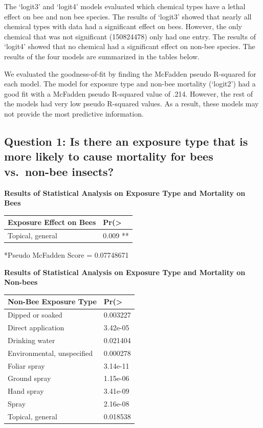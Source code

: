 \documentclass[
  12pt,
]{article}
\begin{document}
The `logit3' and `logit4' models evaluated which chemical types have a
lethal effect on bee and non bee species. The results of `logit3' showed
that nearly all chemical types with data had a significant effect on
bees. However, the only chemical that was not significant (150824478)
only had one entry. The results of `logit4' showed that no chemical had
a significant effect on non-bee species. The results of the four models
are summarized in the tables below.

We evaluated the goodness-of-fit by finding the McFadden pseudo
R-squared for each model. The model for exposure type and non-bee
mortality (`logit2') had a good fit with a McFadden pseudo R-squared
value of .214. However, the rest of the models had very low pseudo
R-squared values. As a result, these models may not provide the most
predictive information.

\hypertarget{question-1-is-there-an-exposure-type-that-is-more-likely-to-cause-mortality-for-bees-vs.-non-bee-insects}{%
\subsection{Question 1: Is there an exposure type that is more likely to
cause mortality for bees vs.~non-bee
insects?}\label{question-1-is-there-an-exposure-type-that-is-more-likely-to-cause-mortality-for-bees-vs.-non-bee-insects}}

\textbf{Results of Statistical Analysis on Exposure Type and Mortality
on Bees}

\begin{longtable}[]{@{}ll@{}}
\toprule
Exposure Effect on Bees & Pr(\textgreater{} \\
\midrule
\endhead
Topical, general & 0.009 ** \\
\bottomrule
\end{longtable}

*Pseudo McFadden Score = 0.07748671

\textbf{Results of Statistical Analysis on Exposure Type and Mortality
on Non-bees}

\begin{longtable}[]{@{}ll@{}}
\toprule
Non-Bee Exposure Type & Pr(\textgreater{} \\
\midrule
\endhead
Dipped or soaked & 0.003227 \\
Direct application & 3.42e-05 \\
Drinking water & 0.021404 \\
Environmental, unspecified & 0.000278 \\
Foliar spray & 3.14e-11 \\
Ground spray & 1.15e-06 \\
Hand spray & 3.41e-09 \\
Spray & 2.16e-08 \\
Topical, general & 0.018538 \\
\bottomrule
\end{longtable}
\end{document}
